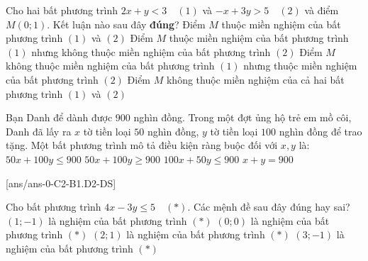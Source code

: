 \begin{ex}%
	Cho hai bất phương trình $2x+y<3\quad (1)$ và $-x+3y>5\quad (2)$ và điểm $M(0;1)$. Kết luận nào sau đây \textbf{đúng}?
	\choice
	{Điểm $M$ thuộc miền nghiệm của bất phương trình $(1)$ và $(2)$}
	{\True Điểm $M$ thuộc miền nghiệm của bất phương trình $(1)$ nhưng không thuộc miền nghiệm của bất phương trình $(2)$}
	{Điểm $M$ không thuộc miền nghiệm của bất phương trình $(1)$ nhưng thuộc miền nghiệm của bất phương trình $(2)$}
	{Điểm $M$ không thuộc miền nghiệm của cả hai bất phương trình $(1)$ và $(2)$}
\end{ex}

\begin{ex}%
	Bạn Danh để dành được $900$ nghìn đồng. Trong một đợt ủng hộ trẻ em mồ côi, Danh đã lấy ra $x$ tờ tiền loại $50$ nghìn đồng, $y$ tờ tiền loại $100$ nghìn đồng để trao tặng. Một bất phương trình mô tả điều kiện ràng buộc đối với $x,y$ là:
	\choice
	{\True $50x+100y\le 900$}
	{$50x+100y\ge 900$}
	{$100x+50y\le 900$}
	{$x+y=900$}
\end{ex}

\cauds
{}[ans/ans-0-C2-B1.D2-DS]
\begin{ex}%
	Cho bất phương trình $4x-3y\le 5\quad (*)$. Các mệnh đề sau đây đúng hay sai?
	\choiceTF
	{$(1;-1)$ là nghiệm của bất phương trình $(*)$}
	{\True $(0;0)$ là nghiệm của bất phương trình $(*)$}
	{\True $(2;1)$ là nghiệm của bất phương trình $(*)$}
	{$(3;-1)$ là nghiệm của bất phương trình $(*)$}
\end{ex}

